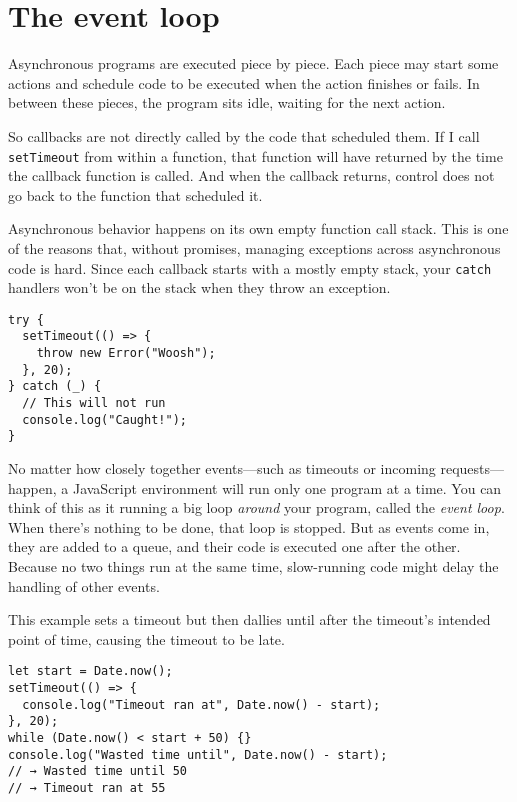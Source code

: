 \section{The event loop}

Asynchronous programs are executed piece by piece. Each piece may start some actions and schedule code to be executed when the action finishes or fails. In between these pieces, the program sits idle, waiting for the next action.

So callbacks are not directly called by the code that scheduled them. If I call \lstinline`setTimeout` from within a function, that function will have returned by the time the callback function is called. And when the callback returns, control does not go back to the function that scheduled it.

Asynchronous behavior happens on its own empty function call
stack. This is one of the reasons that, without promises, managing exceptions across asynchronous code is hard. Since each callback starts with a mostly empty stack, your \lstinline`catch` handlers won't be on the stack when they throw an exception.

\begin{lstlisting}
try {
  setTimeout(() => {
    throw new Error("Woosh");
  }, 20);
} catch (_) {
  // This will not run
  console.log("Caught!");
}
\end{lstlisting}
\noindent{}

No matter how closely together events—such as timeouts or incoming requests—happen, a JavaScript environment will run only one program at a time. You can think of this as it running a big loop \emph{around} your program, called the \emph{event loop}. When there's nothing to be done, that loop is stopped. But as events come in, they are added to a queue, and their code is executed one after the other. Because no two things run at the same time, slow-running code might delay the handling of other events.

This example sets a timeout but then dallies until after the timeout's intended point of time, causing the timeout to be late.

\begin{lstlisting}
let start = Date.now();
setTimeout(() => {
  console.log("Timeout ran at", Date.now() - start);
}, 20);
while (Date.now() < start + 50) {}
console.log("Wasted time until", Date.now() - start);
// → Wasted time until 50
// → Timeout ran at 55
\end{lstlisting}
\noindent{}

